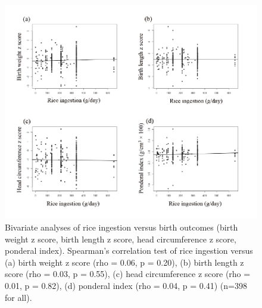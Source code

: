 \begin{figure}
  \centering
    \label{fig:Fig331}
  \includegraphics[scale=1]{Figures/Fig331.pdf}
  \caption[Bivariate analyses of rice ingestion versus birth outcomes (birth weight z score, birth length z score, head circumference z score, ponderal index)]{Bivariate analyses of rice ingestion versus birth outcomes (birth weight z score, birth length z score, head circumference z score, ponderal index). Spearman's correlation test of rice ingestion versus (a) birth weight z score (rho = 0.06, p = 0.20), (b) birth length z score (rho = 0.03, p = 0.55), (c) head circumference z score (rho = 0.01, p = 0.82), (d) ponderal index (rho = 0.04, p = 0.41) (n=398 for all).}
\end{figure}


